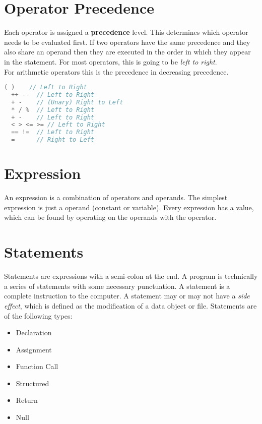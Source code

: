 \documentclass[11pt,a4paper,oneside]{book}
\begin{document}
\section{Operator Precedence}
\noindent Each operator is assigned a \textbf{precedence} level. This determines which
operator needs to be evaluated first. If two operators have the same precedence and they 
also share an operand then they are executed in the order in which they appear in the
statement. For most operators, this is going to be \textit{left to right}.\\

\indent For arithmetic operators this is the precedence in decreasing precedence.

\begin{lstlisting}[language=C, title=Operator precedence]
  ( )    // Left to Right
  ++ --  // Left to Right
  + -    // (Unary) Right to Left
  * / %  // Left to Right
  + -    // Left to Right
  < > <= >= // Left to Right
  == !=  // Left to Right
  =      // Right to Left
\end{lstlisting}

\section{Expression}
\noindent An expression is a combination of operators and operands. The simplest expression
is just a operand (constant or variable). Every expression has a value, which can be found
by operating on the operands with the operator.

\section{Statements}
\noindent Statements are expressions with a semi-colon at the end. A program is technically
a series of statements with some necessary punctuation. A statement is a complete
instruction to the computer. A statement may or may not have a \textit{side effect}, which
is defined as the modification of a data object or file. Statements are of the following
types:

\begin{itemize}
  \itemsep-3pt
  \item Declaration
  \item Assignment
  \item Function Call
  \item Structured
  \item Return
  \item Null
\end{itemize}
\end{document}
